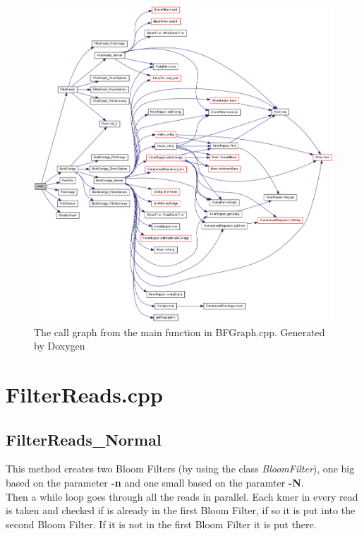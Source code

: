 \documentclass[a4paper]{report}
\renewcommand{\b}[1]{\textbf{#1}}  %
\renewcommand{\i}[1]{\textit{#1}}  %
\begin{document}
\begin{figure}[h!]
\hspace*{-50pt}\includegraphics[scale=0.4]{img/Call_graph.png}
\caption{The call graph from the main function in BFGraph.cpp. Generated by Doxygen\cite{doxygen}}
\label{callgraph}
\end{figure}

\section{FilterReads.cpp}
\subsection{FilterReads\_Normal}
This method creates two Bloom Filters (by using the class \i{BloomFilter}), one big based on the parameter 
\b{-n} and one small based on the paramter \b{-N}. \\[4pt]

Then a while loop goes through all the reads in parallel. Each kmer in every read is taken and checked if is already in the first Bloom Filter,
if so it is put into the second Bloom Filter. If it is not in the first Bloom Filter it is put there. \\[4pt]
\end{document}
